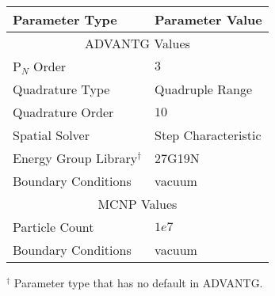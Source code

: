\begin{tabular}{l|m{5cm}}
\toprule
Parameter Type & Parameter Value \\
\midrule \midrule
\multicolumn{2}{c}{ADVANTG Values} \\
\midrule
P$_N$ Order               &    $3$ \\
Quadrature Type           &  Quadruple Range \\
Quadrature Order          &    $10$ \\
Spatial Solver            &  Step Characteristic \\
Energy Group Library$^{\dagger}$     &    27G19N \\
Boundary Conditions & vacuum \\
\midrule \midrule
\multicolumn{2}{c}{MCNP Values} \\
\midrule
Particle Count             &   $1e7$ \\
Boundary Conditions & vacuum \\
\bottomrule
\end{tabular}
\begin{flushleft}
\footnotesize{
  $^{\dagger}$ Parameter type that has no default in ADVANTG. \\
}
\end{flushleft}

